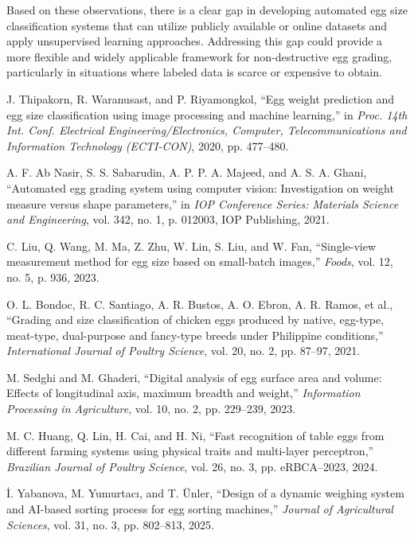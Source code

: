 \documentclass[conference]{IEEEtran}
\begin{document}
	Based on these observations, there is a clear gap in developing automated egg size classification systems that can utilize publicly available or online datasets and apply unsupervised learning approaches. Addressing this gap could provide a more flexible and widely applicable framework for non-destructive egg grading, particularly in situations where labeled data is scarce or expensive to obtain.
	
	\begin{thebibliography}{00}
		
		 J. Thipakorn, R. Waranusast, and P. Riyamongkol, “Egg weight prediction and egg size classification using image processing and machine learning,” in \textit{Proc. 14th Int. Conf. Electrical Engineering/Electronics, Computer, Telecommunications and Information Technology (ECTI-CON)}, 2020, pp. 477–480.
		
		 A. F. Ab Nasir, S. S. Sabarudin, A. P. P. A. Majeed, and A. S. A. Ghani, “Automated egg grading system using computer vision: Investigation on weight measure versus shape parameters,” in \textit{IOP Conference Series: Materials Science and Engineering}, vol. 342, no. 1, p. 012003, IOP Publishing, 2021.
		
		 C. Liu, Q. Wang, M. Ma, Z. Zhu, W. Lin, S. Liu, and W. Fan, “Single-view measurement method for egg size based on small-batch images,” \textit{Foods}, vol. 12, no. 5, p. 936, 2023.
		
		 O. L. Bondoc, R. C. Santiago, A. R. Bustos, A. O. Ebron, A. R. Ramos, et al., “Grading and size classification of chicken eggs produced by native, egg-type, meat-type, dual-purpose and fancy-type breeds under Philippine conditions,” \textit{International Journal of Poultry Science}, vol. 20, no. 2, pp. 87–97, 2021.
		
		 M. Sedghi and M. Ghaderi, “Digital analysis of egg surface area and volume: Effects of longitudinal axis, maximum breadth and weight,” \textit{Information Processing in Agriculture}, vol. 10, no. 2, pp. 229–239, 2023.
		
		 M. C. Huang, Q. Lin, H. Cai, and H. Ni, “Fast recognition of table eggs from different farming systems using physical traits and multi-layer perceptron,” \textit{Brazilian Journal of Poultry Science}, vol. 26, no. 3, pp. eRBCA–2023, 2024.
		
		 İ. Yabanova, M. Yumurtacı, and T. Ünler, “Design of a dynamic weighing system and AI-based sorting process for egg sorting machines,” \textit{Journal of Agricultural Sciences}, vol. 31, no. 3, pp. 802–813, 2025.
		

\end{thebibliography}
\end{document}
